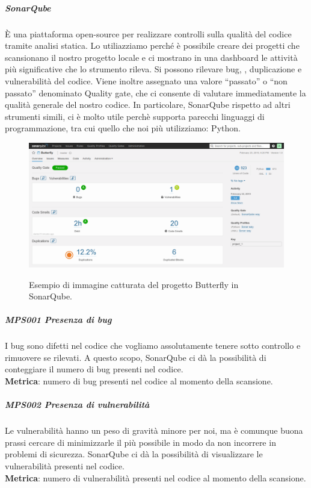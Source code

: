 			\subparagraph{SonarQube} \label{sonarqube}
			È una piattaforma open-source per realizzare controlli sulla qualità del codice tramite analisi statica.
			Lo utiliazziamo perché è possibile creare dei progetti che scansionano il nostro progetto locale e ci mostrano in una dashboard le attività più significative che lo strumento rileva.
			Si possono rilevare bug, , duplicazione e vulnerabilità del codice.
			Viene inoltre assegnato una valore ``passato'' o ``non passato'' denominato Quality gate, che ci consente di valutare immediatamente la qualità generale del nostro codice.
			In particolare, SonarQube rispetto ad altri strumenti simili, ci è molto utile perchè supporta parecchi linguaggi di programmazione, tra cui quello che noi più utilizziamo: Python.

			\begin{figure}[H]
				\centering
				\includegraphics[width=\textwidth]{img/sonar.png}\\
				\caption[Screen SonarQube]{Esempio di immagine catturata del progetto Butterfly in SonarQube.}
				\label{fig:butterflySonar}
			\end{figure}

			\subparagraph{MPS001 Presenza di bug} \label{presenzabug}
			I bug sono difetti nel codice che vogliamo assolutamente tenere sotto controllo e rimuovere se rilevati.
			A questo scopo, SonarQube ci dà la possibilità di conteggiare il numero di bug presenti nel codice. \\
			\textbf{Metrica}: numero di bug presenti nel codice al momento della scansione.

			\subparagraph{MPS002 Presenza di vulnerabilità} \label{presenzavulnerabilita}
			Le vulnerabilità hanno un peso di gravità minore per noi, ma è comunque buona prassi cercare di minimizzarle il più possibile in modo da non incorrere in problemi di sicurezza.
			SonarQube ci dà la possibilità di visualizzare le vulnerabilità presenti nel codice. \\
			\textbf{Metrica}: numero di vulnerabilità presenti nel codice al momento della scansione.

